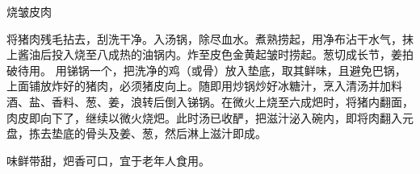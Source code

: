 \begin{recipe}{烧皱皮肉}

\ingredients


\cooking

\step 将猪肉残毛拈去，刮洗干净。入汤锅，除尽血水。煮熟捞起，用净布沾干水气，抹上酱油后投入烧至八成热的油锅内。炸至皮色金黄起皱时捞起。葱切成长节，姜拍破待用。
\step
用锑锅一个，把洗净的鸡（或骨）放入垫底，取其鲜味，且避免巴锅，上面铺放炸好的猪肉，必须猪皮向上。随即用炒锅炒好冰糖汁，烹入清汤并加料酒、盐、香料、葱、姜，浪转后倒入锑锅。在微火上烧至六成𤆵时，将猪内翻面，肉皮即向下了，继续以微火烧𤆵。此时汤已收酽，把滋汁泌入碗内，即将肉翻入元盘，拣去垫底的骨头及姜、葱，然后淋上滋汁即成。

\notes

味鲜带甜，𤆵香可口，宜于老年人食用。

\end{recipe}

